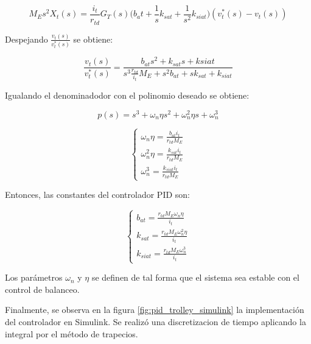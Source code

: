 \documentclass{article}
\begin{document}
            \begin{equation}
                M_E s^2 X_t(s) =  \frac{i_t}{r_{td}} G_T(s)\Big( b_at + \frac{1}{s} k_{sat} + \frac{1}{s^2} k_{siat} \Big)(v_t^*(s) - v_t(s))
            \end{equation}

            Despejando \(\frac{v_t(s)}{v_t^*(s)}\) se obtiene:

            \begin{equation}
                \frac{v_t(s)}{v_t^*(s)} = \frac{b_{at} s^2+k_{sat}s+k{siat}}{s^3 \frac{r_{td}}{i_t}M_E+ s^2 b_{at} + s k_{sat} + k_{siat}}
            \end{equation}

            Igualando el denominadodor con el polinomio deseado se obtiene:

            \begin{equation}\label{(eq:polinomio)}
                p(s)=s^3 + \omega_n \eta s^2 + \omega_n^2 \eta s + \omega_n^3
            \end{equation}

            \begin{equation}
                \begin{cases}
                    \omega_n \eta = \frac{b_{at} i_t}{r_{td}M_E}\\
                    \omega_n^2 \eta = \frac{k_{sat} i_t}{r_{td}M_E}\\
                    \omega_n^3 = \frac{k_{siat} i_t}{r_{td}M_E}
                \end{cases}
            \end{equation}

            Entonces, las constantes del controlador PID son:

            \begin{equation}
                \begin{cases}
                    b_{at} = \frac{r_{td}M_E \omega_n \eta}{i_t}\\
                    k_{sat} = \frac{r_{td}M_E \omega_n^2 \eta}{i_t}\\
                    k_{siat} = \frac{r_{td}M_E \omega_n^3}{i_t}
                \end{cases}
            \end{equation}

            Los parámetros \(\omega_n\) y \(\eta\) se definen de tal forma que el sistema sea estable con el control de balanceo.

            Finalmente, se observa en la figura \ref{fig:pid_trolley_simulink} la implementación del controlador en Simulink. Se realizó una discretizacion de tiempo aplicando la integral por el método de trapecios.
\end{document}
